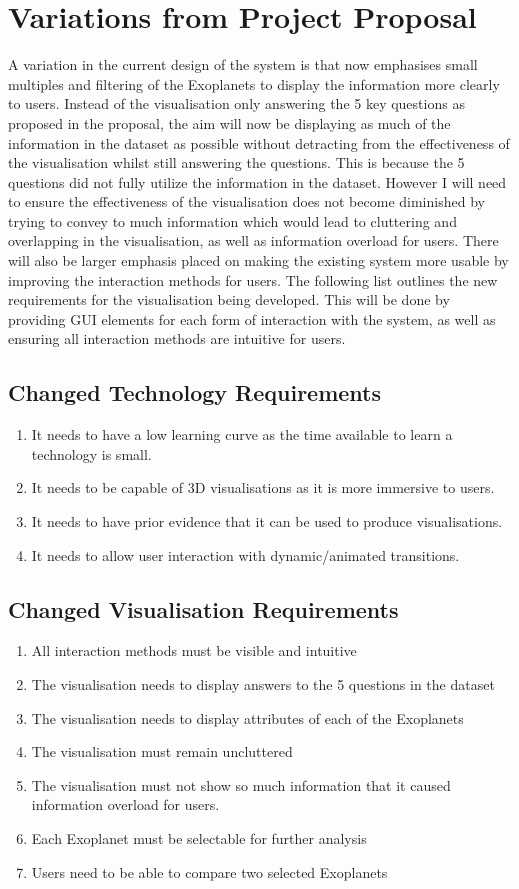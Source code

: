 \documentclass[11pt
              , a4paper
              , twoside
              , openright
              ]{report}
\begin{document}
\section{Variations from Project Proposal}
A variation in the current design of the system is that now emphasises small
multiples and filtering of the Exoplanets to display the information more
clearly to users. Instead of the visualisation only answering the 5 key
questions as proposed in the proposal, the aim will now be displaying as much of
the information in the dataset as possible without detracting from the
effectiveness of the visualisation whilst still answering the questions. This is
because the 5 questions did not fully utilize the information in the dataset.
However I will need to ensure the effectiveness of the visualisation does not
become diminished by trying to convey to much information which would lead to
cluttering and overlapping in the visualisation, as well as information overload
for users. There will also be larger emphasis placed on making the existing
system more usable by improving the interaction methods for users. The following
list outlines the new requirements for the visualisation being developed. This
will be done by 
providing GUI elements for each form of interaction with the system, as well as
ensuring all interaction methods are intuitive for users. 
\subsection{Changed Technology Requirements}
\begin{enumerate}
 \item It needs to have a low learning curve as the time available to learn a
technology is small.
   \item It needs to be capable of 3D visualisations as it is more immersive to
users.
   \item It needs to have prior evidence that it can be used to produce
visualisations.
    \item It needs to allow user interaction with dynamic/animated transitions.
\end{enumerate}
\subsection{Changed Visualisation Requirements}
\begin{enumerate}
 \item All interaction methods must be visible and intuitive
 \item The visualisation needs to display answers to the 5 questions in the
dataset
 \item The visualisation needs to display attributes of each of the Exoplanets
 \item The visualisation must remain uncluttered
 \item The visualisation must not show so much information that it caused
information overload for users.
 \item Each Exoplanet must be selectable for further analysis
 \item Users need to be able to compare two selected Exoplanets
\end{enumerate}
\end{document}
